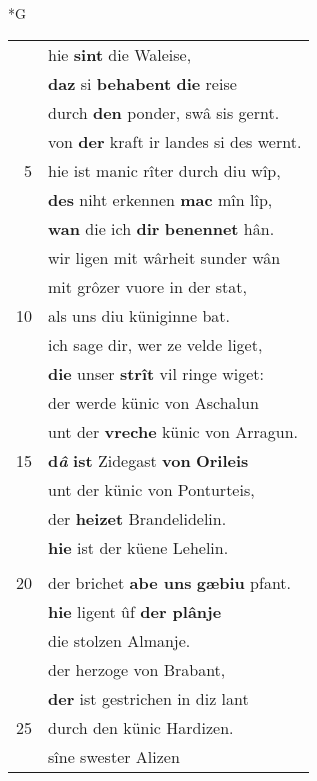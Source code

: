 \documentclass[8pt,a4paper,notitlepage]{article}
\begin{document}
\newpage
\begin{table}[ht]
\begin{minipage}[t]{0.5\linewidth}
\small
\begin{center}*G
\end{center}
\begin{tabular}{rl}
 & hie \textbf{sint} die Waleise,\\ 
 & \textbf{daz} si \textbf{behabent} \textbf{die} reise\\ 
 & durch \textbf{den} ponder, swâ sis gernt.\\ 
 & von \textbf{der} kraft ir landes si des wernt.\\ 
5 & hie ist manic rîter durch diu wîp,\\ 
 & \textbf{des} niht erkennen \textbf{mac} mîn lîp,\\ 
 & \textbf{wan} die ich \textbf{dir} \textbf{benennet} hân.\\ 
 & wir ligen mit wârheit sunder wân\\ 
 & mit grôzer vuore in der stat,\\ 
10 & als uns diu küniginne bat.\\ 
 & ich sage dir, wer ze velde liget,\\ 
 & \textbf{die} unser \textbf{strît} vil ringe wiget:\\ 
 & der werde künic von Aschalun\\ 
 & unt der \textbf{vreche} künic von Arragun.\\ 
15 & \textbf{d\textit{â}} \textbf{ist} Zidegast \textbf{von} \textbf{Orileis}\\ 
 & unt der künic von Ponturteis,\\ 
 & der \textbf{heizet} Brandelidelin.\\ 
 & \textbf{hie} ist der küene Lehelin.\\ 
 & \textbf{\textit{\begin{large}D\end{large}â}} ist Morolt von Yrlant,\\ 
20 & der brichet \textbf{abe uns} \textbf{gæbiu} pfant.\\ 
 & \textbf{hie} ligent ûf \textbf{der plânje}\\ 
 & die stolzen Almanje.\\ 
 & der herzoge von Brabant,\\ 
 & \textbf{der} ist gestrichen in diz lant\\ 
25 & durch den künic Hardizen.\\ 
 & sîne swester Alizen\\ 

\end{tabular}
\end{minipage}
\end{table}
\end{document}
